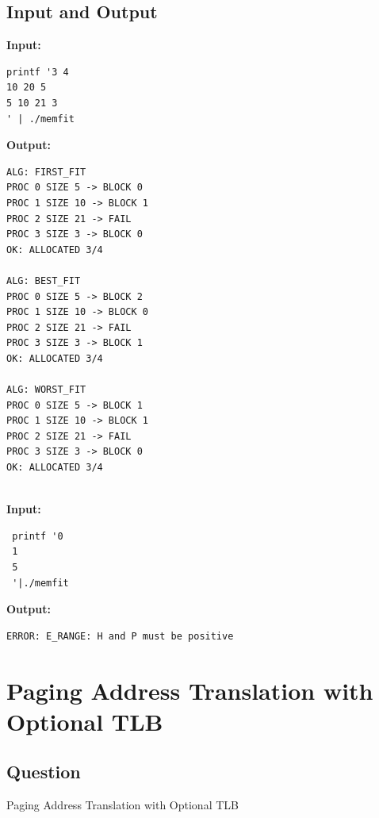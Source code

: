 \documentclass[12pt,a4paper]{article}
\begin{document}
\subsection{Input and Output}
\noindent\textbf{Input:}
\begin{verbatim}
printf '3 4
10 20 5
5 10 21 3
' | ./memfit
\end{verbatim}
\vspace{0.5cm}
\noindent\textbf{Output:}
\begin{verbatim}
ALG: FIRST_FIT
PROC 0 SIZE 5 -> BLOCK 0
PROC 1 SIZE 10 -> BLOCK 1
PROC 2 SIZE 21 -> FAIL
PROC 3 SIZE 3 -> BLOCK 0
OK: ALLOCATED 3/4

ALG: BEST_FIT
PROC 0 SIZE 5 -> BLOCK 2
PROC 1 SIZE 10 -> BLOCK 0
PROC 2 SIZE 21 -> FAIL
PROC 3 SIZE 3 -> BLOCK 1
OK: ALLOCATED 3/4

ALG: WORST_FIT
PROC 0 SIZE 5 -> BLOCK 1
PROC 1 SIZE 10 -> BLOCK 1
PROC 2 SIZE 21 -> FAIL
PROC 3 SIZE 3 -> BLOCK 0
OK: ALLOCATED 3/4
               

\end{verbatim}
\noindent\textbf{Input:}
\begin{verbatim}
 printf '0              
 1                                                                         
 5
 '|./memfit

\end{verbatim}
\vspace{0.5cm}
\noindent\textbf{Output:}
\begin{verbatim}
ERROR: E_RANGE: H and P must be positive

\end{verbatim}
\newpage
\newpage
\section{Paging Address Translation with Optional TLB}
\subsection{Question}
Paging Address Translation with Optional TLB
\end{document}
